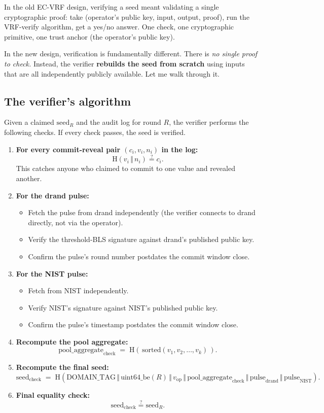 \documentclass[11pt]{article}
\newcommand{\Hash}{\mathrm{H}}
\begin{document}
In the old EC-VRF design, verifying a seed meant validating a single cryptographic proof: take (operator's public key, input, output, proof), run the VRF-verify algorithm, get a yes/no answer. One check, one cryptographic primitive, one trust anchor (the operator's public key).

In the new design, verification is fundamentally different. There is \emph{no single proof to check.} Instead, the verifier \textbf{rebuilds the seed from scratch} using inputs that are all independently publicly available. Let me walk through it.

\subsection*{The verifier's algorithm}

Given a claimed $\text{seed}_R$ and the audit log for round $R$, the verifier performs the following checks. If every check passes, the seed is verified.

\begin{enumerate}[leftmargin=2em, itemsep=4pt]
\item \textbf{For every commit-reveal pair $(c_i, v_i, n_i)$ in the log:}
\[
\Hash(v_i \,\Vert\, n_i) \stackrel{?}{=} c_i.
\]
This catches anyone who claimed to commit to one value and revealed another.

\item \textbf{For the drand pulse:}
\begin{itemize}
\item Fetch the pulse from drand independently (the verifier connects to drand directly, not via the operator).
\item Verify the threshold-BLS signature against drand's published public key.
\item Confirm the pulse's round number postdates the commit window close.
\end{itemize}

\item \textbf{For the NIST pulse:}
\begin{itemize}
\item Fetch from NIST independently.
\item Verify NIST's signature against NIST's published public key.
\item Confirm the pulse's timestamp postdates the commit window close.
\end{itemize}

\item \textbf{Recompute the pool aggregate:}
\[
\text{pool\_aggregate}_{\text{check}} \;=\; \Hash(\,\text{sorted}(v_1, v_2, \ldots, v_k)\,).
\]

\item \textbf{Recompute the final seed:}
\[
\text{seed}_{\text{check}} \;=\; \Hash\!\left(\text{DOMAIN\_TAG} \,\Vert\, \text{uint64\_be}(R) \,\Vert\, v_{\text{op}} \,\Vert\, \text{pool\_aggregate}_{\text{check}} \,\Vert\, \text{pulse}_{\text{drand}} \,\Vert\, \text{pulse}_{\text{NIST}} \right).
\]

\item \textbf{Final equality check:}
\[
\text{seed}_{\text{check}} \stackrel{?}{=} \text{seed}_R.
\]
\end{enumerate}
\end{document}
